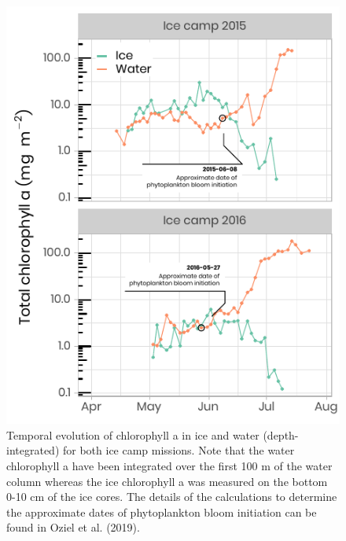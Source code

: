 \documentclass[essd, manuscript]{copernicus}
\begin{document}
\begin{figure}[H]
	\centering
	\includegraphics[scale = 1]{../../../../graphs/fig10.pdf}
	\caption{Temporal evolution of chlorophyll a in ice and water (depth-integrated) for both ice camp missions. Note that the water chlorophyll a have been integrated over the first 100 m of the water column whereas the ice chlorophyll a was measured on the bottom 0-10 cm of the ice cores. The details of the calculations to determine the approximate dates of phytoplankton bloom initiation can be found in Oziel et al. (2019).}
\end{figure}
\end{document}
